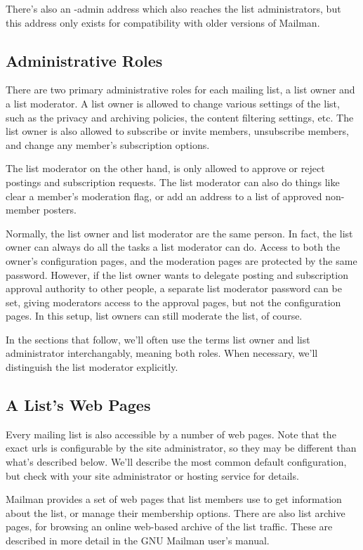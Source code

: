 \documentclass{howto}
\begin{document}
There's also an -admin address which also reaches the list
administrators, but this address only exists for compatibility with
older versions of Mailman.

\subsection{Administrative Roles}

There are two primary administrative roles for each mailing list, a
list owner and a list moderator.  A list owner is allowed to change
various settings of the list, such as the privacy and archiving
policies, the content filtering settings, etc.  The list owner is also
allowed to subscribe or invite members, unsubscribe members, and
change any member's subscription options.

The list moderator on the other hand, is only allowed to approve or
reject postings and subscription requests.  The list moderator can
also do things like clear a member's moderation flag, or add an
address to a list of approved non-member posters.

Normally, the list owner and list moderator are the same person.  In
fact, the list owner can always do all the tasks a list moderator can
do.  Access to both the owner's configuration pages, and the
moderation pages are protected by the same password.  However, if the
list owner wants to delegate posting and subscription approval
authority to other people, a separate list moderator password can be
set, giving moderators access to the approval pages, but not the
configuration pages.  In this setup, list owners can still moderate
the list, of course.

In the sections that follow, we'll often use the terms list owner and
list administrator interchangably, meaning both roles.  When
necessary, we'll distinguish the list moderator explicitly.

\subsection{A List's Web Pages}

Every mailing list is also accessible by a number of web pages.  Note
that the exact urls is configurable by the site administrator, so they
may be different than what's described below.  We'll describe the most
common default configuration, but check with your site administrator
or hosting service for details.

Mailman provides a set of web pages that list members use to get
information about the list, or manage their membership options.  There
are also list archive pages, for browsing an online web-based archive
of the list traffic.  These are described in more detail in the GNU
Mailman user's manual.
\end{document}
